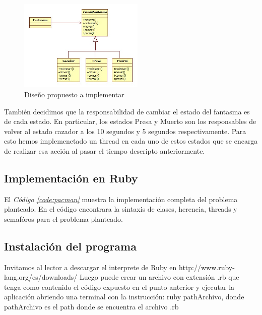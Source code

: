\documentclass{article}
\newcommand{\refcode}[1]{\textit{Código \ref{#1}}}
\begin{document}
\begin{figure}[h]
	\centering
	\includegraphics[width=0.53\textwidth]{images/ejemplo/Diseno.jpg}
	\caption{Diseño propuesto a implementar}
\end{figure}

\par
También decidimos que la responsabilidad de cambiar el estado del fantasma es de cada estado. En particular, los estados Presa y Muerto son los responsables de volver al estado cazador a los 10 segundos y 5 segundos respectivamente. Para esto hemos implemenetado un thread en cada uno de estos estados que se encarga de realizar esa acción al pasar el tiempo descripto anteriormente. 

\medskip
\bigskip

\subsection{Implementación en Ruby}

	El \refcode{code:pacman} muestra la implementación completa del problema planteado. En el código encontrara la sintaxis de clases, herencia, threads y semafóros para el problema planteado.

 
\bigskip\bigskip

\subsection{Instalación del programa}
Invitamos al lector a descargar el interprete de Ruby en http://www.ruby-lang.org/es/downloads/
Luego puede crear un archivo con extensión .rb que tenga como contenido el código expuesto en el punto anterior y ejecutar la aplicación abriendo una terminal con la instrucción: ruby pathArchivo, donde pathArchivo es el path donde se encuentra el archivo .rb 
\end{document}
